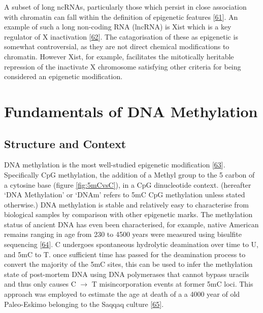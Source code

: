 \documentclass[
]{book}
\begin{document}
\begin{enumerate}
  A subset of long ncRNAs, particularly those which persist in close association with chromatin can fall within the definition of epigenetic features {[}\protect\hyperlink{ref-Kaikkonen2011}{61}{]}.
  An example of such a long non-coding RNA (lncRNA) is Xist which is a key regulator of X inactivation {[}\protect\hyperlink{ref-Cerase2015}{62}{]}.
  The catagorisation of these as epigenetic is somewhat controversial, as they are not direct chemical modifications to chromatin. However Xist, for example, facilitates the mitotically heritable repression of the inactivate X chromosome satisfying other criteria for being considered an epigenetic modification.
\end{enumerate}

\hypertarget{fundamentals-of-dna-methylation}{%
\section{Fundamentals of DNA Methylation}\label{fundamentals-of-dna-methylation}}

\hypertarget{structure-and-context}{%
\subsection{Structure and Context}\label{structure-and-context}}

DNA methylation is the most well-studied epigenetic modification {[}\protect\hyperlink{ref-Haluskova2010}{63}{]}.
Specifically CpG methylation, the addition of a Methyl group to the 5 carbon of a cytosine base (figure \ref{fig:5mCvsC}), in a CpG dinucleotide context.
(hereafter `DNA Methylation' or `DNAm' refers to 5mC CpG methylation unless stated otherwise.)
DNA methylation is stable and relatively easy to characterise from biological samples by comparison with other epigenetic marks.
The methylation status of ancient DNA has even been characterised, for example, native American remains ranging in age from 230 to 4500 years were measured using bisulfite sequencing {[}\protect\hyperlink{ref-Smith2015}{64}{]}.
C undergoes spontaneous hydrolytic deamination over time to U, and 5mC to T.
once sufficient time has passed for the deamination process to convert the majority of the 5mC sites, this can be used to infer the methylation state of post-mortem DNA using DNA polymerases that cannot bypass uracils and thus only causes C \(\rightarrow\) T misincorporation events at former 5mC loci.
This approach was employed to estimate the age at death of a a 4000 year of old Paleo-Eskimo belonging to the Saqqaq culture {[}\protect\hyperlink{ref-Pedersen2014}{65}{]}.
\end{document}
